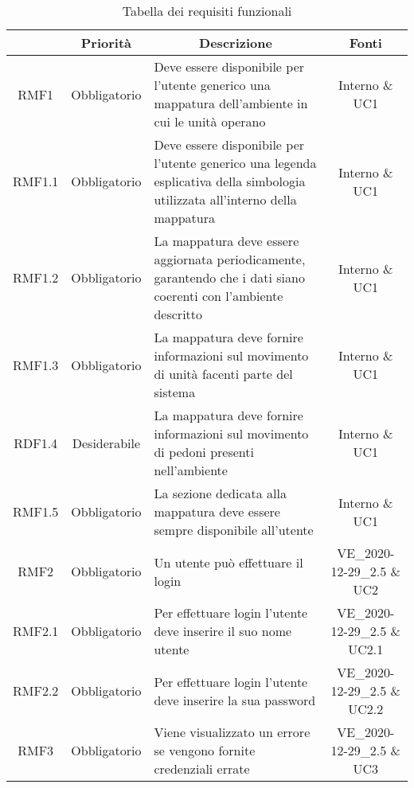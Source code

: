 	\newcommand*{\thead}[1]{\multicolumn{1}{c}{\bfseries #1}}
	\setlength{\tabcolsep}{10pt}
	\begin{longtable}[h!] { c c m{8cm} c}
		\caption{Tabella dei requisiti funzionali} \\
		\rowcolor{lightgray}
		\thead{Requisito} & \thead{Priorità} & \thead{Descrizione} & \thead{Fonti} \\ \endhead%

		RMF1 & Obbligatorio & Deve essere disponibile per l'utente generico una mappatura dell'ambiente in cui le unità operano & Interno \& UC1 \\

		RMF1.1 & Obbligatorio & Deve essere disponibile per l'utente generico una legenda esplicativa della simbologia utilizzata all'interno della mappatura & Interno \& UC1 \\

		RMF1.2 & Obbligatorio & La mappatura deve essere aggiornata periodicamente, garantendo che i dati siano coerenti con l'ambiente descritto & Interno \& UC1 \\

		RMF1.3 & Obbligatorio & La mappatura deve fornire informazioni sul movimento di unità facenti parte del sistema & Interno \& UC1 \\

		RDF1.4 & Desiderabile & La mappatura deve fornire informazioni sul movimento di pedoni presenti nell'ambiente & Interno \& UC1 \\

		RMF1.5 & Obbligatorio & La sezione dedicata alla mappatura deve essere sempre disponibile all'utente & Interno \& UC1 \\

		RMF2 & Obbligatorio & Un utente può effettuare il login & VE\_2020-12-29\_2.5 \& UC2 \\

		RMF2.1 & Obbligatorio & Per effettuare login l'utente deve inserire il suo nome utente & VE\_2020-12-29\_2.5 \& UC2.1 \\

		RMF2.2 & Obbligatorio & Per effettuare login l'utente deve inserire la sua password & VE\_2020-12-29\_2.5 \& UC2.2 \\

		RMF3 & Obbligatorio & Viene visualizzato un errore se vengono fornite credenziali errate & VE\_2020-12-29\_2.5 \& UC3 \\


\end{longtable}
